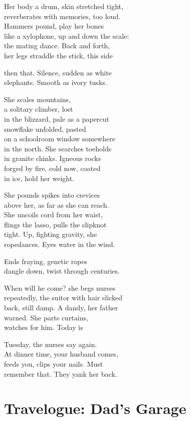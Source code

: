 \documentclass[twoside,10pt]{book}
\begin{document}
Her body a drum, skin stretched tight,\\
reverberates with memories, too loud.\\
Hammers pound, play her bones\\
like a xylophone, up and down the scale:\\
the mating dance. Back and forth,\\
her legs straddle the stick, this side

then that. Silence, sudden as white\\
elephants. Smooth as ivory tusks.

She scales mountains,\\
a solitary climber, lost\\
in the blizzard, pale as a papercut\\
snowflake unfolded, pasted\\
on a schoolroom window somewhere\\
in the north. She searches toeholds\\
in granite chinks. Igneous rocks\\
forged by fire, cold now, coated\\
in ice, hold her weight.

She pounds spikes into crevices\\
above her, as far as she can reach.\\
She uncoils cord from her waist,\\
flings the lasso, pulls the slipknot\\
tight. Up, fighting gravity, she\\
ropedances. Eyes water in the wind.

Ends fraying, genetic ropes\\
dangle down, twist through centuries.

When will he come? she begs nurses\\
repeatedly, the suitor with hair slicked\\
back, still damp. A dandy, her father\\
warned. She parts curtains,\\
watches for him. Today is

Tuesday, the nurses say again.\\
At dinner time, your husband comes,\\
feeds you, clips your nails. Must\\
remember that. They yank her back.


\clearpage
\section{Travelogue: Dad's Garage}
\end{document}
